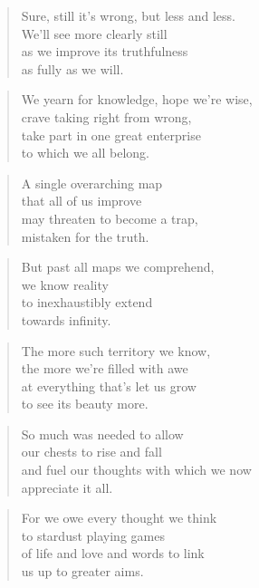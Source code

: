 \documentclass[10pt,a4paper]{article}
\begin{document}
\begin{multicols}{2}
\begin{verse}
Sure, still it’s wrong, but less and less.\\
We’ll see more clearly still\\
as we improve its truthfulness\\
as fully as we will.
\end{verse}

\begin{verse}
We yearn for knowledge, hope we’re wise,\\
crave taking right from wrong,\\
take part in one great enterprise\\
to which we all belong.
\end{verse}

\begin{verse}
A single overarching map\\
that all of us improve\\
may threaten to become a trap,\\
mistaken for the truth.
\end{verse}

\begin{verse}
But past all maps we comprehend,\\
we know reality\\
to inexhaustibly extend\\
towards infinity.
\end{verse}

\begin{verse}
The more such territory we know,\\
the more we’re filled with awe\\
at everything that’s let us grow\\
to see its beauty more.
\end{verse}

\begin{verse}
So much was needed to allow\\
our chests to rise and fall\\
and fuel our thoughts with which we now\\
appreciate it all.
\end{verse}

\begin{verse}
For we owe every thought we think\\
to stardust playing games\\
of life and love and words to link\\
us up to greater aims.
\end{verse}


\end{multicols}
\end{document}
